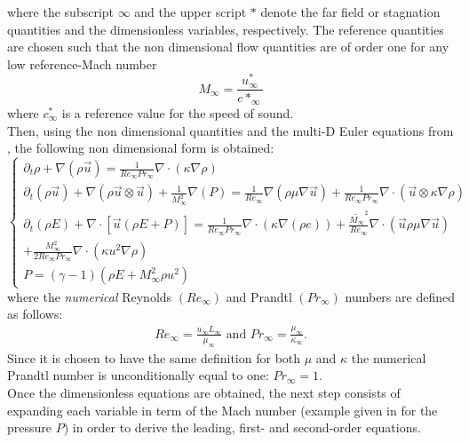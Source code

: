 where  the subscript $\infty$ and the upper script $*$ denote the far field or stagnation quantities and the dimensionless variables, respectively. The reference quantities are chosen such that the non dimensional flow quantities are of order one for any low reference-Mach number
\begin{equation}
M_{\infty} = \frac{u^*_{\infty}}{c*_{\infty}}
\end{equation}
where $c^*_{\infty}$ is a reference value for the speed of sound.\\
Then, using the non dimensional quantities and the multi-D Euler equations from  , the following non dimensional form is obtained:
 \begin{equation}
\label{eq:Euler_eq2}
\left\{ 
\begin{array}{l}
\partial_t \rho+ \nabla \left(  \rho \vec{u}  \right) = \frac{1}{Re_{\infty} Pr_{\infty}} \nabla \cdot ( \kappa \nabla \rho )\nonumber\\
\partial_t \left( \rho \vec{u} \right) + \nabla \left( \rho \vec{u}\otimes \vec{u} \right) + \frac{1}{M_{\infty}^2}\nabla \left( P \right) = \frac{1}{Re_{\infty}}\nabla \left( \rho \mu \nabla \vec{u} \right) + \frac{1}{Re_{\infty} Pr_{\infty}} \nabla \cdot (\vec{u}\otimes \kappa \nabla \rho )\\
\partial_t \left( \rho E \right) + \nabla \cdot \left[ \vec{u} \left( \rho E + P \right) \right] = \frac{1}{Re_{\infty} Pr_{\infty}} \nabla \cdot(\kappa \nabla(\rho e)) + \frac{\tilde{M_{\infty}}^2}{Re_{\infty}}\nabla \cdot \left( \vec{u} \rho \mu \nabla \vec{u} \right) \nonumber \\
+ \frac{M_{\infty}^2}{2 Re_{\infty} Pr_{\infty}} \nabla \cdot (\kappa u^2 \nabla \rho) \nonumber \\
P = \left( \gamma-1 \right) \left( \rho E + M_{\infty}^2 \rho u^2 \right)\nonumber
\end{array}
\right.
\end{equation}
where the \emph{numerical} Reynolds $(Re_{\infty})$ and Prandtl $(Pr_{\infty})$ numbers are defined as follows:
\begin{eqnarray}
\label{eq:ref_numb}
Re_{\infty} = \frac{u_{\infty} L_{\infty}}{\mu_{\infty}} \text{ and }
Pr_{\infty} = \frac{\mu_{\infty}}{\kappa_{\infty}} \text{.}
\end{eqnarray}
Since it is chosen to have the same definition for both $\mu$ and $\kappa$ the numerical Prandtl number is unconditionally equal to one: $Pr_{\infty} = 1$. \\
Once the dimensionless equations are obtained, the next step consists of expanding each variable in term of the Mach number (example given in  for the pressure $P$) in order to derive the leading, first- and second-order equations. 
